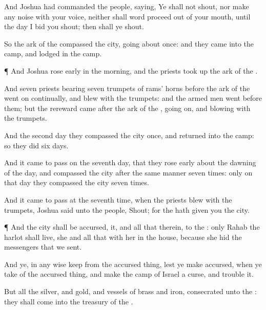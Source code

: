 {And
Joshua had
commanded the
people,
saying, Ye shall not
shout, nor make any
noise with your
voice, neither shall
{}
word
proceed out of your
mouth, until the
day I
bid you
shout; then shall ye
shout.

So the
ark of the
{}
compassed the
city, going
about
{}
once: and they
came into the
camp, and
lodged in the
camp.


\par }{\PP {}¶ And
Joshua rose
early in the
morning, and the
priests took
up the
ark of the
{}.

And
seven
priests
bearing
seven
trumpets of
rams’ horns
before the
ark of the
{} went
on
continually, and
blew with the
trumpets: and the armed
men
went
before them; but the
rereward
came
after the
ark of the
{},
{} going
on, and
blowing with the
trumpets.

And the
second
day they
compassed the
city
once, and
returned into the
camp: so they
did
six
days.

And it came to pass on the
seventh
day, that they rose
early about the
dawning of the
day, and
compassed the
city after the same
manner
seven
times: only on that
day they
compassed the
city
seven
times.

And it came to pass at the
seventh
time, when the
priests
blew with the
trumpets,
Joshua
said unto the
people,
Shout; for the
{} hath
given you the
city.


\par }{\PP {}¶ And the
city shall be
accursed,
{} it, and all that
{} therein, to the
{}: only
Rahab the
harlot shall
live, she and all that
{} with her in the
house, because she
hid the
messengers that we
sent.

And ye, in any
wise
keep
{} from the accursed
thing, lest ye make
{}
accursed, when ye
take of the accursed
thing, and
make the
camp of
Israel a
curse, and
trouble it.

But all the
silver, and
gold, and
vessels of
brass and
iron,
{}
consecrated unto the
{}: they shall
come into the
treasury of the
{}.

}
